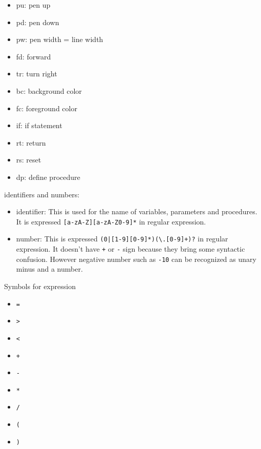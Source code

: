 \begin{itemize}
\tightlist
\item
  pu: pen up
\item
  pd: pen down
\item
  pw: pen width = line width
\item
  fd: forward
\item
  tr: turn right
\item
  bc: background color
\item
  fc: foreground color
\item
  if: if statement
\item
  rt: return
\item
  rs: reset
\item
  dp: define procedure
\end{itemize}

identifiers and numbers:

\begin{itemize}
\tightlist
\item
  identifier: This is used for the name of variables, parameters and
  procedures. It is expressed
  \passthrough{\lstinline![a-zA-Z][a-zA-Z0-9]*!} in regular expression.
\item
  number: This is expressed
  \passthrough{\lstinline!(0|[1-9][0-9]*)(\\.[0-9]+)?!} in regular
  expression. It doesn't have \passthrough{\lstinline!+!} or
  \passthrough{\lstinline!-!} sign because they bring some syntactic
  confusion. However negative number such as
  \passthrough{\lstinline!-10!} can be recognized as unary minus and a
  number.
\end{itemize}

Symbols for expression

\begin{itemize}
\tightlist
\item
  \passthrough{\lstinline!=!}
\item
  \passthrough{\lstinline!>!}
\item
  \passthrough{\lstinline!<!}
\item
  \passthrough{\lstinline!+!}
\item
  \passthrough{\lstinline!-!}
\item
  \passthrough{\lstinline!*!}
\item
  \passthrough{\lstinline!/!}
\item
  \passthrough{\lstinline!(!}
\item
  \passthrough{\lstinline!)!}
\end{itemize}

